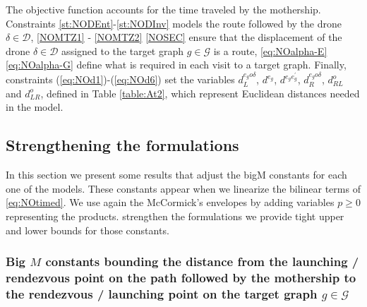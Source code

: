 \noindent
The objective function accounts for the time traveled by the mothership. Constraints \eqref{st:NODEnt}-\eqref{st:NODInv} models the route followed by the drone $\delta\in\mathcal D$, \eqref{NOMTZ1} - \eqref{NOMTZ2}  \eqref{NOSEC} ensure that the displacement of the drone $\delta\in\mathcal D$ assigned to the target graph $g\in\mathcal G$ is a route, \eqref{eq:NOalpha-E}  \eqref{eq:NOalpha-G} define what is required in each visit to a target graph. Finally, constraints (\ref{eq:NOd1})-(\ref{eq:NOd6}) set the variables $d_L^{e_go\delta}$, $d^{e_g}$, $d^{e_ge^\prime_g}$, $d_R^{e_go\delta}$, $d_{RL}^o$ and $d_{LR}^o$, defined in Table \ref{table:At2}, which represent Euclidean distances needed in the model. \\

\subsection*{Strengthening the formulations}
\noindent
In this section\RE{,} we present some results that adjust the bigM constants for each one of the models. These constants appear when we linearize the bilinear terms of \eqref{eq:NOtimed}. We use again the McCormick's envelopes by adding variables $p\geq 0$  representing the products.  strengthen the formulations\RE{,} we provide tight upper and lower bounds for those constants.  




\subsubsection*{Big $M$ constants bounding the distance from the launching / rendezvous point on the path followed by the mothership to the rendezvous / launching point on the target graph $g\in \mathcal{G}$}

